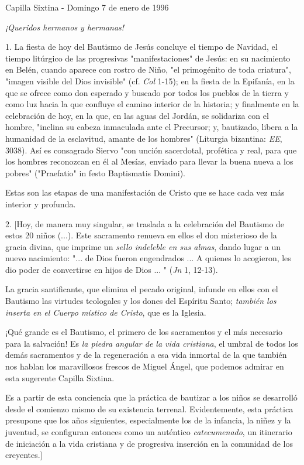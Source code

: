 \begin{body}
Capilla Sixtina - Domingo 7 de enero de 1996

\emph{¡Queridos hermanos y hermanas!}

1. La fiesta de hoy del Bautismo de Jesús concluye el tiempo de Navidad, el tiempo litúrgico de las progresivas "manifestaciones" de Jesús: en su nacimiento en Belén, cuando aparece con rostro de Niño, "el primogénito de toda criatura", "imagen visible del Dios invisible" (cf. \emph{Col} 1-15); en la fiesta de la Epifanía, en la que se ofrece como don esperado y buscado por todos los pueblos de la tierra y como luz hacia la que confluye el camino interior de la historia; y finalmente en la celebración de hoy, en la que, en las aguas del Jordán, se solidariza con el hombre, "inclina su cabeza inmaculada ante el Precursor; y, bautizado, libera a la humanidad de la esclavitud, amante de los hombres" (Liturgia bizantina: \emph{EE}, 3038). Así es consagrado Siervo "con unción sacerdotal, profética y real, para que los hombres reconozcan en él al Mesías, enviado para llevar la buena nueva a los pobres" ("Praefatio" in festo Baptismatis Domini).

Estas son las etapas de una manifestación de Cristo que se hace cada vez más interior y profunda.

2. {[}Hoy, de manera muy singular, se traslada a la celebración del Bautismo de estos 20 niños (...). Este sacramento renueva en ellos el don misterioso de la gracia divina, que imprime un \emph{sello indeleble en sus almas}, dando lugar a un nuevo nacimiento: "... de Dios fueron engendrados ... A quienes lo acogieron, les dio poder de convertirse en hijos de Dios ... " (\emph{Jn} 1, 12-13).

La gracia santificante, que elimina el pecado original, infunde en ellos con el Bautismo las virtudes teologales y los dones del Espíritu Santo; \emph{también los inserta en el Cuerpo místico de Cristo}, que es la Iglesia.

¡Qué grande es el Bautismo, el primero de los sacramentos y el más necesario para la salvación! Es \emph{la piedra angular de la vida cristiana}, el umbral de todos los demás sacramentos y de la regeneración a esa vida inmortal de la que también nos hablan los maravillosos frescos de Miguel Ángel, que podemos admirar en esta sugerente Capilla Sixtina.

Es a partir de esta conciencia que la práctica de bautizar a los niños se desarrolló desde el comienzo mismo de su existencia terrenal. Evidentemente, esta práctica presupone que los años siguientes, especialmente los de la infancia, la niñez y la juventud, se configuran entonces como un auténtico \emph{catecumenado}, un itinerario de iniciación a la vida cristiana y de progresiva inserción en la comunidad de los creyentes.{]}


\end{body}

